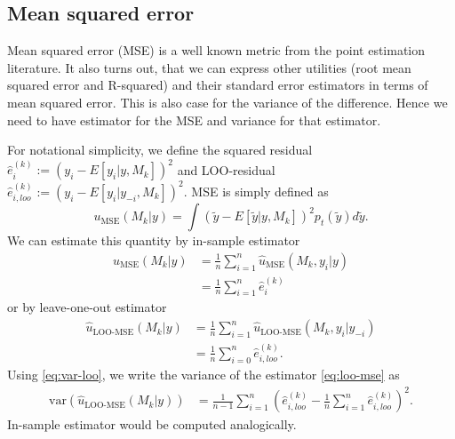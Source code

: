 \documentclass{article}
\newcommand{\residual}[2][i]{\hat{e}_{#1}^{(#2)}}
\begin{document}
\subsection{Mean squared error}
Mean squared error (MSE) is a well known metric from the point estimation literature. It also turns out, that we can express other utilities (root mean squared error and R-squared) and their standard error estimators in terms of mean squared error. This is also case for the variance of the difference. Hence we need to have estimator for the MSE and variance for that estimator.

For notational simplicity, we define the squared residual $\residual{k} := (y_i - E[y_i | y, M_k])^2$ and LOO-residual $\residual[i, loo]{k} := (y_i - E[y_i | y_{-i}, M_k])^2$. MSE is simply defined as
\begin{equation}
    u_{\text{MSE}}(M_k | y) = \int \left( \tilde{y} - E\left[ \tilde{y} | y, M_k \right] \right)^2 p_t(\tilde{y}) d\tilde{y}.
\end{equation}
We can estimate this quantity by in-sample estimator
\begin{align}
    \hat{u}_{\text{MSE}}(M_k | y) &= \frac{1}{n} \sum_{i=1}^n \hat{u}_{\text{MSE}}(M_k, y_i | y) \nonumber \\ 
    &= \frac{1}{n} \sum_{i=1}^n \residual{k}
\end{align}
or by leave-one-out estimator
\begin{align}
    \hat{u}_{\text{LOO-MSE}}(M_k | y) &=\frac{1}{n} \sum_{i=1}^n \hat{u}_{\text{LOO-MSE}}(M_k, y_i | y_{-i}) \nonumber \\
    &=\frac{1}{n} \sum_{i=0}^n \residual[i,loo]{k}. \label{eq:loo-mse}
\end{align}
Using \eqref{eq:var-loo}, we write the variance of the estimator \eqref{eq:loo-mse} as
\begin{align}
    \widehat{\text{var}}\left( \hat{u}_{\text{LOO-MSE}}(M_k | y) \right) &= \frac{1}{n-1} \sum_{i = 1}^n \left( \residual[i, loo]{k} -  \frac{1}{n} \sum_{i=1}^n \residual[i, loo]{k} \right)^2 \label{eq:var-loo-mse}.
\end{align}
In-sample estimator would be computed analogically. 

\end{document}
